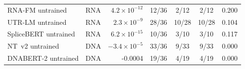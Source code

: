 \begin{table}[htbp]
\begin{tabular}{llrcccc}
RNA-FM untrained             & RNA & $4.2 \times 10^{-12}$ & 12/36 & 2/12 & 2/12 & 0.200 \\
UTR-LM untrained             & RNA & $2.3 \times 10^{-9}$ & 28/36 & 10/28 & 10/28 & 0.104 \\
SpliceBERT untrained         & RNA & $6.2 \times 10^{-15}$ & 10/36 & 3/10 & 3/10 & 0.117 \\
NT~v2 untrained              & DNA & $-3.4 \times 10^{-5}$ & 33/36 & 9/33 & 9/33 & 0.000 \\
DNABERT-2 untrained          & DNA & -0.0004 & 19/36 & 4/19 & 4/19 & 0.000 \\
\bottomrule
\end{tabular}
\end{table}
